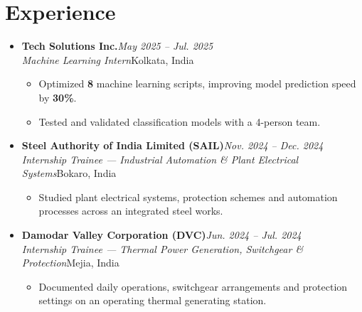 \documentclass[a4paper,9pt]{extarticle}
\newcommand{\entry}[2]{\textbf{#1}\hfill\textit{#2}\\}
\newcommand{\subentry}[2]{\textit{#1}\hfill#2\\[-7pt]}
\newenvironment{points}
  {\begin{itemize}[label=--,leftmargin=1.2em,topsep=1pt,itemsep=1pt,parsep=0pt]}
  {\end{itemize}\vspace{1pt}}
\newenvironment{entries}
  {\begin{itemize}[label=$\bullet$,leftmargin=1em,topsep=1pt,itemsep=2pt,parsep=0pt]}
  {\end{itemize}}
\begin{document}
\section{Experience}
\begin{entries}

\item \entry{Tech Solutions Inc.}{May 2025 -- Jul. 2025}
      \subentry{Machine Learning Intern}{Kolkata, India}
      \begin{points}
        \item Optimized \textbf{8} machine learning scripts, improving model prediction speed by \textbf{30\%}.
        \item Tested and validated classification models with a 4-person team.
      \end{points}

\item \entry{Steel Authority of India Limited (SAIL)}{Nov. 2024 -- Dec. 2024}
      \subentry{Internship Trainee --- Industrial Automation \& Plant Electrical Systems}{Bokaro, India}
      \begin{points}
        \item Studied plant electrical systems, protection schemes and automation processes across an integrated steel works.
      \end{points}

\item \entry{Damodar Valley Corporation (DVC)}{Jun. 2024 -- Jul. 2024}
      \subentry{Internship Trainee --- Thermal Power Generation, Switchgear \& Protection}{Mejia, India}
      \begin{points}
        \item Documented daily operations, switchgear arrangements and protection settings on an operating thermal generating station.
      \end{points}

\end{entries}

\end{document}
